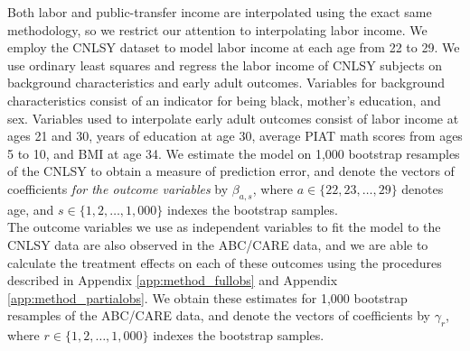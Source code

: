 \noindent Both labor and public-transfer income are interpolated using the exact same methodology, so we restrict
our attention to interpolating labor income. We employ the CNLSY dataset to model labor
income at each age from 22 to 29. We use ordinary least squares and regress the labor income of
CNLSY subjects on background characteristics and early adult outcomes. Variables for background
characteristics consist of an indicator for being  black, mother's education, and sex. Variables
used to interpolate early adult outcomes consist of labor income at ages 21 and 30, years of education at age 30, average
PIAT math scores from ages 5 to 10, and BMI at age 34. We estimate the model on 1,000 bootstrap
resamples of the CNLSY to obtain a measure of prediction error, and denote the vectors of coefficients
\emph{for the outcome variables} by $\beta_{a,s}$, where $a \in \{22, 23, \dots, 29\}$ denotes age, and
$s \in \{1,2,\dots, 1,000\}$ indexes the bootstrap samples. \\

\noindent The outcome variables we use as independent variables to fit the model to the CNLSY data are also
observed in the ABC/CARE data, and we are able to calculate the treatment effects on each of these outcomes
using the procedures described in Appendix \ref{app:method_fullobs} and Appendix \ref{app:method_partialobs}. We
obtain these estimates for 1,000 bootstrap resamples of the ABC/CARE data, and denote the vectors of
coefficients by $\gamma_r$, where $r \in \{1,2,\dots,1,000\}$ indexes the bootstrap samples. \\

